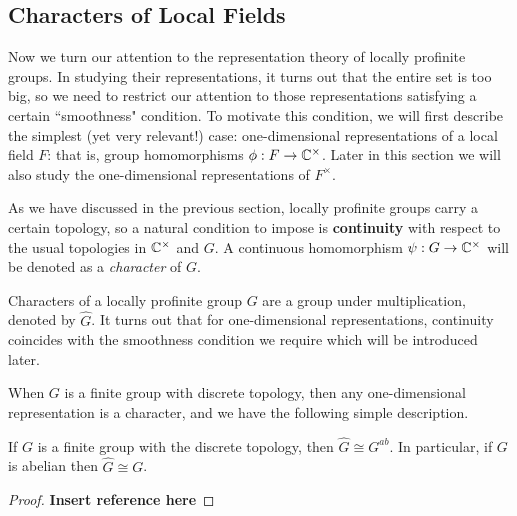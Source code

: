 \subsection{Characters of Local Fields}

Now we turn our attention to the representation theory of locally profinite groups. In studying their representations, it turns out that the entire set is too big, so we need to restrict our attention to those representations satisfying a certain ``smoothness" condition. To motivate this condition, we will first describe the simplest (yet very relevant!) case: one-dimensional representations of a local field $F$: that is, group homomorphisms $\phi:F\rightarrow\mathbb{C}^{\times}$. Later in this section we will also study the one-dimensional representations of $F^{\times}$.

As we have discussed in the previous section, locally profinite groups carry a certain topology, so a natural condition to impose is \textbf{continuity} with respect to the usual topologies in $\mathbb{C}^{\times}$ and $G$. A continuous homomorphism $\psi:G\rightarrow\mathbb{C}^{\times}$ will be denoted as a \textit{character} of $G$.

Characters of a locally profinite group $G$ are a group under multiplication, denoted by $\hat{G}$. It turns out that for one-dimensional representations, continuity coincides with the smoothness condition we require which will be introduced later. 

When $G$ is a finite group with discrete topology, then any one-dimensional representation is a character, and we have the following simple description.

\begin{prop}
    If $G$ is a finite group with the discrete topology, then $\hat{G}\cong G^{ab}$. In particular, if $G$ is abelian then $\hat{G}\cong G$.
\end{prop}
\begin{proof}
    \textbf{Insert reference here}
\end{proof}

